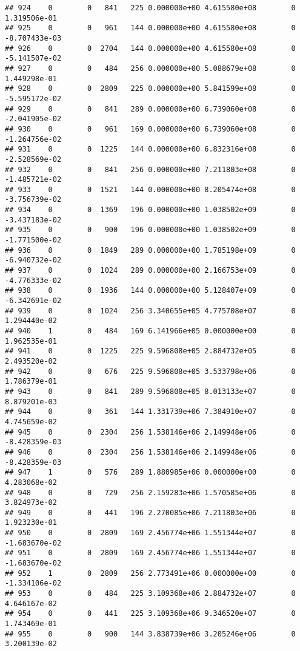 \documentclass[
]{article}
\begin{document}
\begin{enumerate}
\begin{verbatim}
## 924    0        0   841   225 0.000000e+00 4.615580e+08        0  1.319506e-01
## 925    0        0   961   144 0.000000e+00 4.615580e+08        0 -8.707433e-03
## 926    0        0  2704   144 0.000000e+00 4.615580e+08        0 -5.141507e-02
## 927    0        0   484   256 0.000000e+00 5.088679e+08        0  1.449298e-01
## 928    0        0  2809   225 0.000000e+00 5.841599e+08        0 -5.595172e-02
## 929    0        0   841   289 0.000000e+00 6.739060e+08        0 -2.041905e-02
## 930    0        0   961   169 0.000000e+00 6.739060e+08        0 -1.264756e-02
## 931    0        0  1225   144 0.000000e+00 6.832316e+08        0 -2.528569e-02
## 932    0        0   841   256 0.000000e+00 7.211803e+08        0 -1.485721e-02
## 933    0        0  1521   144 0.000000e+00 8.205474e+08        0 -3.756739e-02
## 934    0        0  1369   196 0.000000e+00 1.038502e+09        0 -3.437183e-02
## 935    0        0   900   196 0.000000e+00 1.038502e+09        0 -1.771500e-02
## 936    0        0  1849   289 0.000000e+00 1.785198e+09        0 -6.940732e-02
## 937    0        0  1024   289 0.000000e+00 2.166753e+09        0 -4.776333e-02
## 938    0        0  1936   144 0.000000e+00 5.128407e+09        0 -6.342691e-02
## 939    0        0  1024   256 3.340655e+05 4.775708e+07        0  1.294440e-02
## 940    1        0   484   169 6.141966e+05 0.000000e+00        0  1.962535e-01
## 941    0        0  1225   225 9.596808e+05 2.884732e+05        0  2.493520e-02
## 942    0        0   676   225 9.596808e+05 3.533798e+06        0  1.786379e-01
## 943    0        0   841   289 9.596808e+05 8.013133e+07        0  8.879201e-03
## 944    0        0   361   144 1.331739e+06 7.384910e+07        0  4.745659e-02
## 945    0        0  2304   256 1.538146e+06 2.149948e+06        0 -8.428359e-03
## 946    0        0  2304   256 1.538146e+06 2.149948e+06        0 -8.428359e-03
## 947    1        0   576   289 1.880985e+06 0.000000e+00        0  4.283068e-02
## 948    0        0   729   256 2.159283e+06 1.570585e+06        0  3.824973e-02
## 949    0        0   441   196 2.270085e+06 7.211803e+06        0  1.923230e-01
## 950    0        0  2809   169 2.456774e+06 1.551344e+07        0 -1.683670e-02
## 951    0        0  2809   169 2.456774e+06 1.551344e+07        0 -1.683670e-02
## 952    1        0  2809   256 2.773491e+06 0.000000e+00        0 -1.334106e-02
## 953    0        0   484   225 3.109368e+06 2.884732e+07        0  4.646167e-02
## 954    0        0   441   225 3.109368e+06 9.346520e+07        0  1.743469e-01
## 955    0        0   900   144 3.838739e+06 3.205246e+06        0  3.200139e-02

\end{verbatim}
\end{enumerate}
\end{document}
